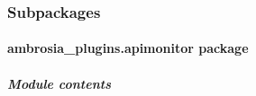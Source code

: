 \documentclass[letterpaper,10pt,english]{sphinxmanual}
\begin{document}
\subsubsection{Subpackages}
\label{ambrosia_plugins:subpackages}

\paragraph{ambrosia\_plugins.apimonitor package}
\label{ambrosia_plugins.apimonitor:ambrosia-plugins-apimonitor-package}\label{ambrosia_plugins.apimonitor::doc}

\subparagraph{Module contents}
\label{ambrosia_plugins.apimonitor:module-contents}\label{ambrosia_plugins.apimonitor:module-ambrosia_plugins.apimonitor}
\end{document}
